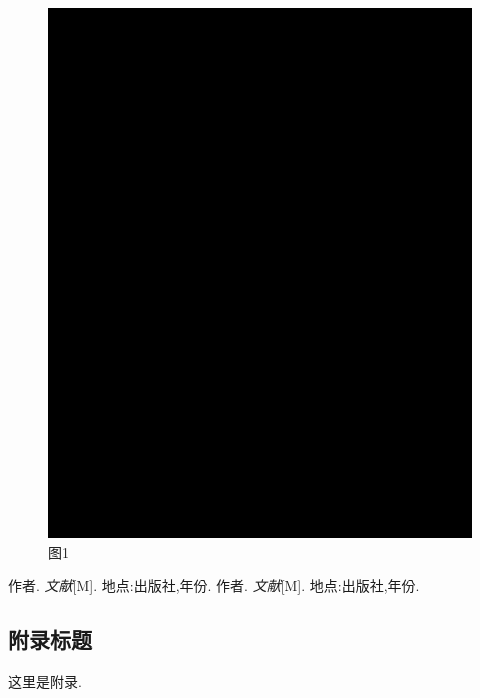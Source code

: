 \documentclass[12pt, a4paper, oneside]{ctexart}
\begin{document}
\begin{figure} [htbp!]
    \centering
    \includegraphics[scale=0.5]{fig.png}
    \caption{图1}
    \label{fig1}
\end{figure}
\begin{thebibliography}{99}
    作者. \emph{文献}[M]. 地点:出版社,年份.
    作者. \emph{文献}[M]. 地点:出版社,年份.
\end{thebibliography}

\begin{appendices}
    \renewcommand{\thesection}{\Alph{section}}
    \section{附录标题}
    这里是附录.
\end{appendices}
\end{document}
